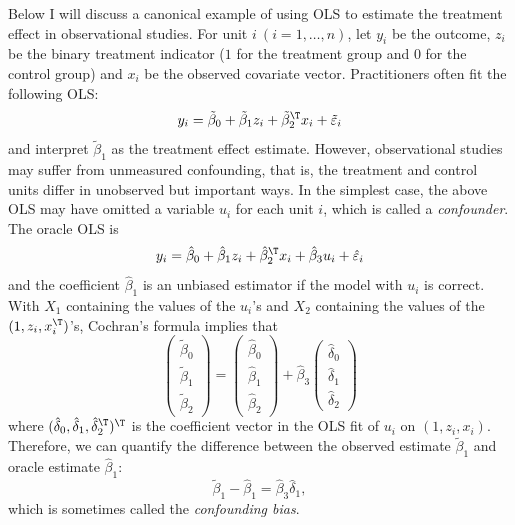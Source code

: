 Below I will discuss a canonical example of using OLS to estimate the treatment effect in observational studies. For unit $i\  (i = 1, \ldots, n)$, let $y_i$ be the outcome, $z_i$ be the binary treatment indicator ($1$ for the treatment group and $0$ for the control group) and $x_i$ be the observed covariate vector. Practitioners often fit the following OLS:
$$
y_i = \tilde{\beta}_0 + \tilde{\beta}_1 z_i + \tilde{\beta}^{\T}_2 x_i + \tilde{\varepsilon}_i
$$
and interpret $ \tilde{\beta}_1$ as the treatment effect estimate. However, observational studies may suffer from unmeasured confounding, that is, the treatment and control units differ in unobserved but important ways. In the simplest case, the above OLS may have omitted a variable $u_i$ for each unit $i$, which is called a {\it confounder}. The oracle OLS is
$$
y_i = \hat{\beta}_0 + \hat{\beta}_1 z_i + \hat{\beta}^{\T}_2 x_i  + \hat{\beta}_3 u_i + \hat{\varepsilon}_i
$$
and the coefficient $ \hat{\beta}_1$ is an unbiased estimator if the model with $u_i$ is correct. 
With $X_1$ containing the values of the $u_i$'s and $X_2$ containing the values of the $(1, z_i, x_i^{\T})$'s, Cochran's formula implies that
$$
\begin{pmatrix}
\tilde{\beta}_0 \\
 \tilde{\beta}_1 \\
  \tilde{\beta}_2
\end{pmatrix}
=
\begin{pmatrix}
\hat{\beta}_0 \\
 \hat{\beta}_1 \\
  \hat{\beta}_2
\end{pmatrix}
+ 
\hat{\beta}_3 \begin{pmatrix}
 \hat{\delta}_0 \\
 \hat{\delta}_1 \\
  \hat{\delta}_2
\end{pmatrix}
$$
where $(  \hat{\delta}_0,  \hat{\delta}_1, \hat{\delta}_2^{\T})^{\T}$ is the coefficient vector in the OLS fit of $u_i$ on $(1, z_i, x_i)$. Therefore, we can
quantify the difference between the observed estimate $ \tilde{\beta}_1$ and oracle estimate $ \hat{\beta}_1$:
$$
\tilde{\beta}_1  - \hat{\beta}_1 =  \hat{\beta}_3 \hat{\delta}_1,
$$
which is sometimes called the {\it confounding bias}. 

